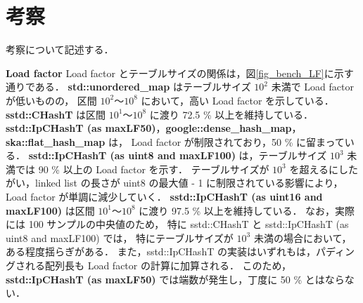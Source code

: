 \chapter{考察}
\label{chap_Discussion}

考察について記述する．
\leavevmode \newline

%
{\bf Load factor}
\samepage\newline\indent
Load factor とテーブルサイズの関係は，図\ref{fig_bench_LF}に示す通りである．
{\bf std::unordered\_map} はテーブルサイズ $10^2$ 未満で Load factor が低いものの，
区間 $10^2〜10^8$ において，高い Load factor を示している．
{\bf sstd::CHashT} は区間 $10^1〜10^8$ に渡り 72.5 \% 以上を維持している．
{\bf sstd::IpCHashT (as maxLF50)}，{\bf google::dense\_hash\_map}，{\bf ska::flat\_hash\_map} は，
Load factor が制限されており，50 \% に留まっている．
{\bf sstd::IpCHashT (as uint8 and maxLF100)} は，テーブルサイズ $10^3$ 未満では 90 \% 以上の Load factor を示す．
テーブルサイズが $10^3$ を超えるにしたがい，linked list の長さが uint8 の最大値 - 1 に制限されている影響により，
Load factor が単調に減少していく．
{\bf sstd::IpCHashT (as uint16 and maxLF100)} は区間 $10^1〜10^8$ に渡り 97.5 \% 以上を維持している．
なお，実際には 100 サンプルの中央値のため，
特に sstd::CHashT と sstd::IpCHashT (as uint8 and maxLF100) では，
特にテーブルサイズが $10^3$ 未満の場合において，ある程度揺らぎがある．
また，sstd::IpCHashT の実装はいずれもは，パディングされる配列長も Load factor の計算に加算される．
このため，{\bf sstd::IpCHashT (as maxLF50)} では端数が発生し，丁度に 50 \% とはならない．
\leavevmode \newline

